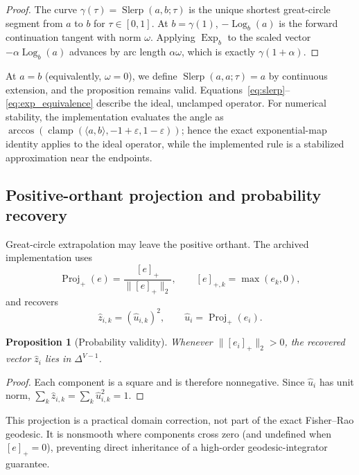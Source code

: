 \documentclass[10pt]{article}
\newtheorem{proposition}{Proposition}
\newcommand{\simplex}{\Delta^{V-1}}
\newcommand{\Exp}{\operatorname{Exp}}
\newcommand{\Log}{\operatorname{Log}}
\newcommand{\Slerp}{\operatorname{Slerp}}
\newcommand{\Projplus}{\operatorname{Proj}_{+}}
\newcommand{\eps}{\varepsilon}
\begin{document}
\begin{proof}
The curve $\gamma(\tau)=\Slerp(a,b;\tau)$ is the unique shortest great-circle segment from $a$ to
$b$ for $\tau\in[0,1]$.  At $b=\gamma(1)$, $-\Log_b(a)$ is the forward continuation tangent with
norm $\omega$.  Applying $\Exp_b$ to the scaled vector $-\alpha\Log_b(a)$ advances by arc length
$\alpha\omega$, which is exactly $\gamma(1+\alpha)$.
\end{proof}

At $a=b$ (equivalently, $\omega=0$), we define $\Slerp(a,a;\tau)=a$ by continuous extension,
and the proposition remains valid.  Equations~\eqref{eq:slerp}--\eqref{eq:exp_equivalence} describe
the ideal, unclamped operator.  For numerical stability, the implementation evaluates the angle as
$\arccos(\operatorname{clamp}(\langle a,b\rangle,-1+\eps,1-\eps))$; hence the exact exponential-map
identity applies to the ideal operator, while the implemented rule is a stabilized approximation near
the endpoints.

\subsection{Positive-orthant projection and probability recovery}

Great-circle extrapolation may leave the positive orthant.  The archived implementation uses
\begin{equation}
  \Projplus(e)=\frac{[e]_+}{\lVert[e]_+\rVert_2},
  \qquad [e]_{+,k}=\max(e_k,0),
  \label{eq:retraction}
\end{equation}
and recovers
\begin{equation}
  \widehat z_{i,k}=(\widehat u_{i,k})^2,
  \qquad \widehat u_i=\Projplus(e_i).
  \label{eq:prob_recovery}
\end{equation}

\begin{proposition}[Probability validity]
Whenever $\lVert[e_i]_+\rVert_2>0$, the recovered vector $\widehat z_i$ lies in $\simplex$.
\end{proposition}

\begin{proof}
Each component is a square and is therefore nonnegative.  Since $\widehat u_i$ has unit norm,
$\sum_k\widehat z_{i,k}=\sum_k\widehat u_{i,k}^2=1$.
\end{proof}

This projection is a practical domain correction, not part of the exact Fisher--Rao geodesic.  It is
nonsmooth where components cross zero (and undefined when $[e]_+=0$), preventing direct inheritance
of a high-order geodesic-integrator guarantee.
\end{document}
